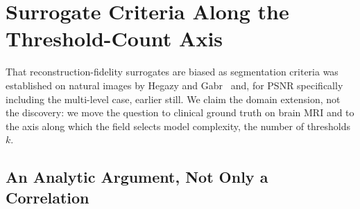 %
%
\section{Surrogate Criteria Along the Threshold-Count Axis}
\label{sec:r2}

That reconstruction-fidelity surrogates are biased as segmentation criteria was
established on natural images by Hegazy and Gabr~\cite{hegazy_metricbias} and, for
PSNR specifically including the multi-level case, earlier still. We claim the
domain extension, not the discovery: we move the question to clinical ground
truth on brain MRI and to the axis along which the field selects model
complexity, the number of thresholds $k$.

\subsection{An Analytic Argument, Not Only a Correlation}

